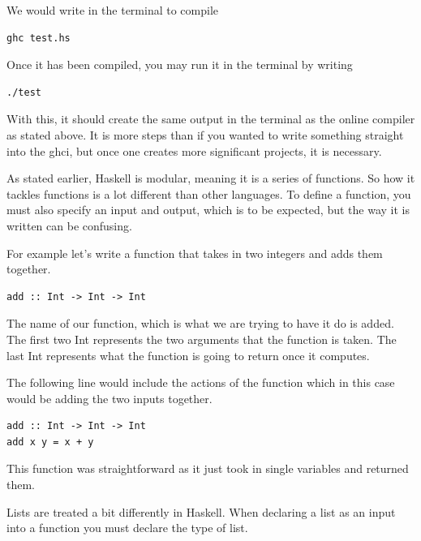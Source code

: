 \documentclass{article}
\begin{document}
\medskip\noindent
We would write in the terminal to compile

\medskip\noindent
\begin{lstlisting}
ghc test.hs
\end{lstlisting}

\medskip\noindent
Once it has been compiled, you may run it in the terminal by writing

\medskip\noindent
\begin{lstlisting}
./test
\end{lstlisting}

\medskip\noindent
With this, it should create the same output in the terminal as the online compiler as stated above. It is more steps than if you wanted to write something straight into the ghci, but once one creates more significant projects, it is necessary. 

\medskip\noindent
As stated earlier, Haskell is modular, meaning it is a series of functions. So how it tackles functions is a lot different than other languages. To define a function, you must also specify an input and output, which is to be expected, but the way it is written can be confusing. 

\medskip\noindent
For example let’s write a function that takes in two integers and adds them together. 

\medskip\noindent
\begin{lstlisting}
add :: Int -> Int -> Int
\end{lstlisting}

\medskip\noindent
The name of our function, which is what we are trying to have it do is added. The first two Int represents the two arguments that the function is taken. The last Int represents what the function is going to return once it computes. 

\medskip\noindent
The following line would include the actions of the function which in this case would be adding the two inputs together.

\medskip\noindent
\begin{lstlisting}
add :: Int -> Int -> Int
add x y = x + y 
\end{lstlisting}

\medskip\noindent
This function was straightforward as it just took in single variables and returned them.  

\medskip\noindent
Lists are treated a bit differently in Haskell. When declaring a list as an input into a function you must declare the type of list. 
\end{document}
